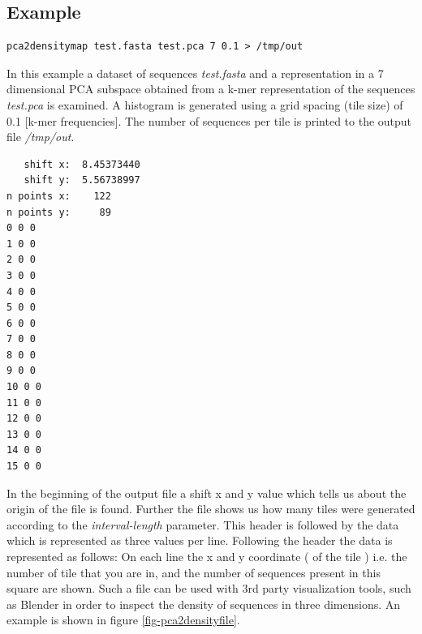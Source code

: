 \subsection{Example}
\begin{lstlisting}
pca2densitymap test.fasta test.pca 7 0.1 > /tmp/out
\end{lstlisting}
In this example a dataset of sequences \emph{test.fasta} and a
representation in a 7 dimensional PCA subspace obtained from a k-mer
representation of the sequences \emph{test.pca} is examined. A
histogram is generated using a grid spacing (tile size) of 0.1
[k-mer frequencies]. The number of sequences per tile is
printed to the output file \emph{/tmp/out}.
\begin{lstlisting}
   shift x:  8.45373440
   shift y:  5.56738997
n points x:    122
n points y:     89
0 0 0
1 0 0
2 0 0
3 0 0
4 0 0
5 0 0
6 0 0
7 0 0
8 0 0
9 0 0
10 0 0
11 0 0
12 0 0
13 0 0
14 0 0
15 0 0
\end{lstlisting}
In the beginning of the output file a shift x and y value
which tells us about the origin of the file is found. Further the file shows us
how many tiles were generated according to the \emph{interval-length}
parameter. This header is followed by the data which is represented as
three values per line.
Following the header the data is represented as follows:
On each line the x and y coordinate ( of the tile ) i.e. the
number of tile that you are in, and the number of sequences present in this
square are shown. Such a file can be used with
3rd party visualization tools, such as Blender \cite{blender} in
order to inspect the density of sequences in three dimensions. An
example is shown in figure \ref{fig-pca2densityfile}.
